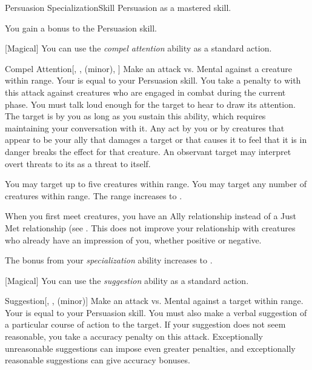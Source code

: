     \begin{feat}{Persuasion Specialization}{Skill}
        \featpre Persuasion as a mastered skill.

         You gain a  bonus to the Persuasion skill.

        [Magical] You can use the \textit{compel attention} ability as a standard action.
        \begin{freeability}{Compel Attention}[, ,  (minor), ]
            Make an attack vs. Mental against a creature within \rngmed range.
            Your  is equal to your Persuasion skill.
            You take a  penalty to  with this attack against creatures who are engaged in combat during the current phase.
            You must talk loud enough for the target to hear to draw its attention.
            \hit The target is \fascinated by you as long as you sustain this ability, which requires maintaining your conversation with it.
            Any act by you or by creatures that appear to be your ally that damages a target or that causes it to feel that it is in danger breaks the effect for that creature.
            An observant target may interpret overt threats to its  as a threat to itself.

            \rankline
             You may target up to five creatures within range.
             You may target any number of creatures within range.
             The range increases to \distrange.
        \end{freeability}

         When you first meet creatures, you have an Ally relationship instead of a Just Met relationship (see .
        This does not improve your relationship with creatures who already have an impression of you, whether positive or negative.

         The bonus from your \textit{specialization} ability increases to .

        [Magical] You can use the \textit{suggestion} ability as a standard action.
        \begin{freeability}{Suggestion}[, ,  (minor)]
            Make an attack vs. Mental against a target within \rngmed range.
            Your  is equal to your Persuasion skill.
            You must also make a verbal suggestion of a particular course of action to the target.
            If your suggestion does not seem reasonable, you take a  accuracy penalty on this attack.
            Exceptionally unreasonable suggestions can impose even greater penalties, and exceptionally reasonable suggestions can give accuracy bonuses.


\end{freeability}
\end{feat}
